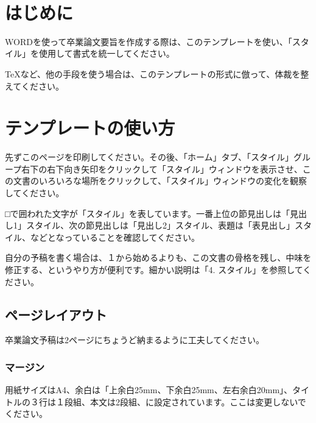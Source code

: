 \documentclass[9pt,twocolumn]{jarticle}
\begin{document}
%
\vspace{-1.4em}
\section{はじめに}
WORDを使って卒業論文要旨を作成する際は、このテンプレートを使い、「スタイル」を使用して書式を統一してください。

TeXなど、他の手段を使う場合は、このテンプレートの形式に倣って、体裁を整えてください。
\section{テンプレートの使い方}
先ずこのページを印刷してください。その後、「ホーム」タブ、「スタイル」グループ右下の右下向き矢印をクリックして「スタイル」ウィンドウを表示させ、この文書のいろいろな場所をクリックして、「スタイル」ウィンドウの変化を観察してください。

□で囲われた文字が「スタイル」を表しています。一番上位の節見出しは「見出し1」スタイル、次の節見出しは「見出し2」スタイル、表題は「表見出し」スタイル、などとなっていることを確認してください。

自分の予稿を書く場合は、１から始めるよりも、この文書の骨格を残し、中味を修正する、というやり方が便利です。細かい説明は「4. スタイル」を参照してください。
\subsection{ページレイアウト}
卒業論文予稿は2ページにちょうど納まるように工夫してください。
\subsubsection{マージン}
用紙サイズはA4、余白は「上余白25mm、下余白25mm、左右余白20mm」、タイトルの３行は１段組、本文は2段組、に設定されています。ここは変更しないでください。
\end{document}
